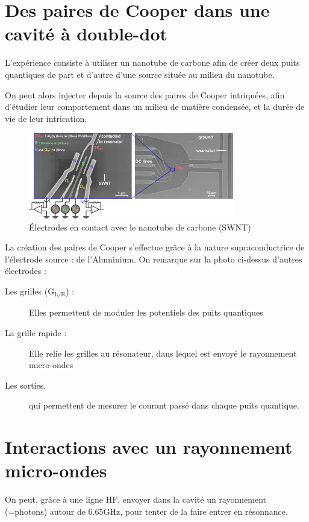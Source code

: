\section{Des paires de Cooper dans une cavité à double-dot}
L'expérience consiste à utiliser un nanotube de carbone afin de créer deux puits quantiques de part et d'autre d'une source située au milieu du nanotube.\newline

On peut alors injecter depuis la source des paires de Cooper intriquées, afin d'étudier leur comportement dans un milieu de matière condensée, et la durée de vie de leur intrication.\newline

\begin{figure}[h]
    \begin{center}
        \includegraphics[width=0.8\textwidth]{Images/Expe_photo}
        \caption{Électrodes en contact avec le nanotube de carbone (SWNT)}
        \label{photo_expe}
    \end{center}
\end{figure}

La création des paires de Cooper s'effectue grâce à la nature supraconductrice de l'électrode source : de l'Aluminium.\newline
On remarque sur la photo ci-dessus d'autres électrodes :

\begin{description}
    \item[Les grilles (G$_\text{L/R}$) :] Elles permettent de moduler les potentiels des puits quantiques
    \item[La grille rapide :] Elle relie les grilles au résonateur, dans lequel est envoyé le rayonnement micro-ondes
    \item[Les sorties,] qui permettent de mesurer le courant passé dans chaque puits quantique.
\end{description}


\section{Interactions avec un rayonnement micro-ondes}
On peut, grâce à une ligne HF, envoyer dans la cavité un rayonnement (=photons) autour de 6.65GHz, pour tenter de la faire entrer en résonnance.

